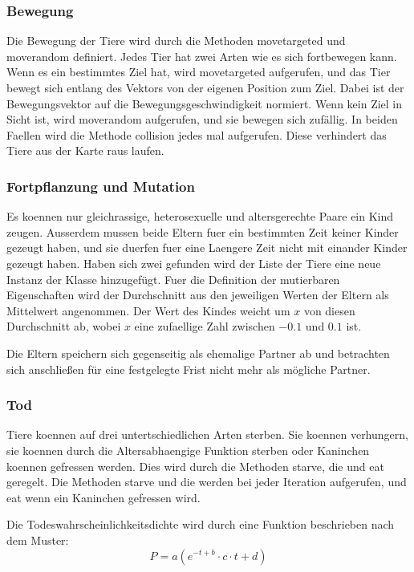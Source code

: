 \documentclass[12pt]{article}
\begin{document}
\subsubsection{Bewegung}
Die Bewegung der Tiere wird durch die Methoden \colorbox{gray!40}{movetargeted}
und \colorbox{gray!40}{moverandom} definiert.
Jedes Tier hat zwei Arten wie es sich fortbewegen kann.
Wenn es ein bestimmtes Ziel hat, wird \colorbox{gray!40}{movetargeted}
aufgerufen, und das Tier bewegt sich entlang des Vektors von der eigenen Position zum Ziel.
Dabei ist der Bewegungsvektor auf die Bewegungsgeschwindigkeit normiert.
Wenn kein Ziel in Sicht ist, wird \colorbox{gray!40}{moverandom} aufgerufen, und sie bewegen sich zufällig.
In beiden Faellen wird die Methode \colorbox{gray!40}{collision} jedes mal aufgerufen.
Diese verhindert das Tiere aus der Karte raus laufen.
\subsubsection{Fortpflanzung und Mutation}
Es koennen nur gleichrassige, heterosexuelle und altersgerechte Paare ein Kind zeugen.
Ausserdem mussen beide Eltern fuer ein bestimmten Zeit keiner Kinder gezeugt haben, und sie duerfen fuer eine Laengere Zeit nicht mit einander Kinder gezeugt haben.
Haben sich zwei gefunden wird der Liste der Tiere eine neue Instanz der Klasse hinzugefügt.
Fuer die Definition der mutierbaren  Eigenschaften wird der Durchschnitt aus den jeweiligen Werten der Eltern als Mittelwert angenommen.
Der Wert des Kindes weicht um $x$ von diesen Durchschnitt ab, wobei $x$ eine zufaellige Zahl zwischen $-0.1$ und $0.1$ ist.

Die Eltern speichern sich gegenseitig als ehemalige Partner ab und betrachten
sich anschließen für eine festgelegte Frist nicht mehr als mögliche Partner. 
\subsubsection{Tod}
Tiere koennen auf drei untertschiedlichen Arten sterben.
Sie koennen verhungern, sie koennen durch die Altersabhaengige Funktion sterben
oder Kaninchen koennen gefressen werden.
Dies wird durch die Methoden \colorbox{gray!40}{starve}, \colorbox{gray!40}{die}
und \colorbox{gray!40}{eat} geregelt.
Die Methoden \colorbox{gray!40}{starve} und \colorbox{gray!40}{die} werden bei
jeder Iteration aufgerufen, und \colorbox{gray!40}{eat} wenn ein Kaninchen gefressen wird.

Die Todeswahrscheinlichkeitsdichte wird durch eine Funktion beschrieben nach dem Muster:
\begin{equation}
    P = a ( {e}^{-t + b} \cdot c \cdot t + d)
\end{equation}
\end{document}
